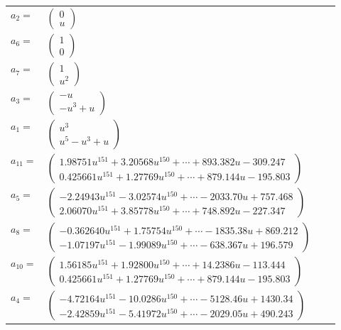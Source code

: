 \documentclass[1p]{elsarticle_modified}
\theoremstyle{definition}
\begin{document}
\begin{tabular}{m{7pt} m{180pt} m{7pt} m{180pt} }
\flushright $a_{2}=$&$\begin{pmatrix}0\\u\end{pmatrix}$ \\
\flushright $a_{6}=$&$\begin{pmatrix}1\\0\end{pmatrix}$ \\
\flushright $a_{7}=$&$\begin{pmatrix}1\\u^2\end{pmatrix}$ \\
\flushright $a_{3}=$&$\begin{pmatrix}- u\\- u^3+u\end{pmatrix}$ \\
\flushright $a_{1}=$&$\begin{pmatrix}u^3\\u^5- u^3+u\end{pmatrix}$ \\
\flushright $a_{11}=$&$\begin{pmatrix}1.98751 u^{151}+3.20568 u^{150}+\cdots+893.382 u-309.247\\0.425661 u^{151}+1.27769 u^{150}+\cdots+879.144 u-195.803\end{pmatrix}$ \\
\flushright $a_{5}=$&$\begin{pmatrix}-2.24943 u^{151}-3.02574 u^{150}+\cdots-2033.70 u+757.468\\2.06070 u^{151}+3.85778 u^{150}+\cdots+748.892 u-227.347\end{pmatrix}$ \\
\flushright $a_{8}=$&$\begin{pmatrix}-0.362640 u^{151}+1.75754 u^{150}+\cdots-1835.38 u+869.212\\-1.07197 u^{151}-1.99089 u^{150}+\cdots-638.367 u+196.579\end{pmatrix}$ \\
\flushright $a_{10}=$&$\begin{pmatrix}1.56185 u^{151}+1.92800 u^{150}+\cdots+14.2386 u-113.444\\0.425661 u^{151}+1.27769 u^{150}+\cdots+879.144 u-195.803\end{pmatrix}$ \\
\flushright $a_{4}=$&$\begin{pmatrix}-4.72164 u^{151}-10.0286 u^{150}+\cdots-5128.46 u+1430.34\\-2.42859 u^{151}-5.41972 u^{150}+\cdots-2029.05 u+490.243\end{pmatrix}$ \\

\end{tabular}
\end{document}
